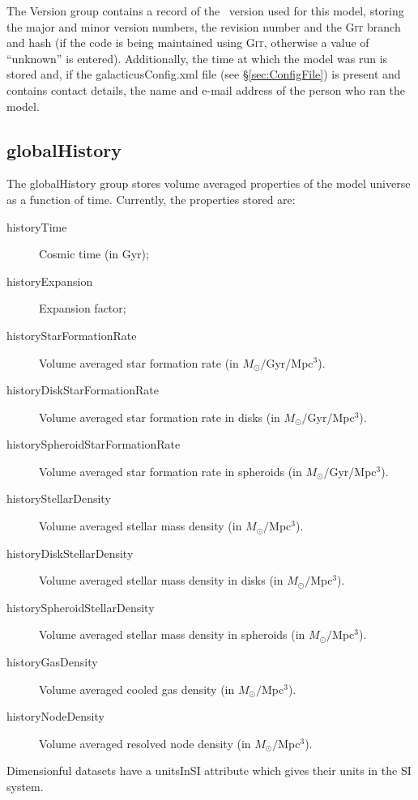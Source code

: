 The {\normalfont \ttfamily Version} group contains a record of the \glc\ version used for this model, storing the major and minor version numbers, the revision number and the {\normalfont \scshape Git} branch and hash (if the code is being maintained using {\normalfont \scshape Git}, otherwise a value of ``{\normalfont \ttfamily unknown}'' is entered). Additionally, the time at which the model was run is stored and, if the {\normalfont \ttfamily galacticusConfig.xml} file (see \S\ref{sec:ConfigFile}) is present and contains contact details, the name and e-mail address of the person who ran the model.

\subsection{globalHistory}\label{sec:globalHistory}

The {\normalfont \ttfamily globalHistory} group stores volume averaged properties of the model universe as a function of time. Currently, the properties stored are:
\begin{description}
 \item[{\normalfont \ttfamily historyTime}] Cosmic time (in Gyr);
 \item[{\normalfont \ttfamily historyExpansion}] Expansion factor;
 \item[{\normalfont \ttfamily historyStarFormationRate}] Volume averaged star formation rate (in $M_\odot/$Gyr/Mpc$^3$).
 \item[{\normalfont \ttfamily historyDiskStarFormationRate}] Volume averaged star formation rate in disks (in $M_\odot/$Gyr/Mpc$^3$).
 \item[{\normalfont \ttfamily historySpheroidStarFormationRate}] Volume averaged star formation rate in spheroids (in $M_\odot/$Gyr/Mpc$^3$).
 \item[{\normalfont \ttfamily historyStellarDensity}] Volume averaged stellar mass density (in $M_\odot/$Mpc$^3$).
 \item[{\normalfont \ttfamily historyDiskStellarDensity}] Volume averaged stellar mass density in disks (in $M_\odot/$Mpc$^3$).
 \item[{\normalfont \ttfamily historySpheroidStellarDensity}] Volume averaged stellar mass density in spheroids (in $M_\odot/$Mpc$^3$).
 \item[{\normalfont \ttfamily historyGasDensity}] Volume averaged cooled gas density (in $M_\odot/$Mpc$^3$).
 \item[{\normalfont \ttfamily historyNodeDensity}] Volume averaged resolved node density (in $M_\odot/$Mpc$^3$).
\end{description}
Dimensionful datasets have a {\normalfont \ttfamily unitsInSI} attribute which gives their units in the SI system.

